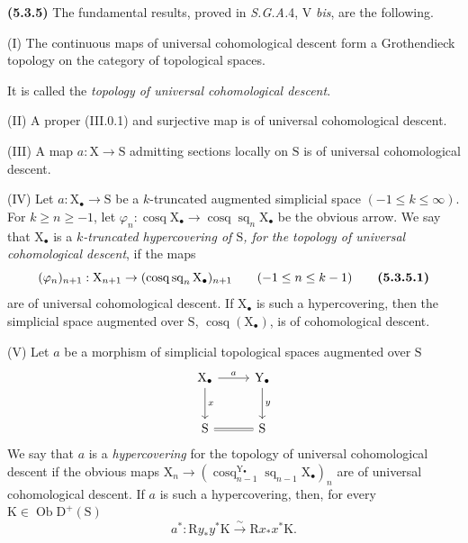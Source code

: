 \documentclass[11pt,leqno]{article}
\begin{document}
\textbf{(5.3.5)} The fundamental results, proved in \textit{S.G.A.}4, V \textit{bis}, are the following.

(I) The continuous maps of universal cohomological descent form a Grothendieck topology on the category of topological spaces.

It is called the \textit{topology of universal cohomological descent}.

(II) A proper (III.0.1) and surjective map is of universal cohomological descent.

(III) A map \(a:\mathrm{X}\to\mathrm{S}\) admitting sections locally on \(\mathrm{S}\) is of universal cohomological descent.

(IV) Let \(a:\mathrm{X}_{\bullet}\to\mathrm{S}\) be a \(k\)-truncated augmented simplicial space \((-1\leq k\leq\infty)\). For \(k\geq n\geq-1\), let \(\varphi_n:\operatorname{cosq}\mathrm{X}_{\bullet}\to\operatorname{cosq}\operatorname{sq}_n\mathrm{X}_{\bullet}\) be the obvious arrow. We say that \(\mathrm{X}_{\bullet}\) is a \textit{\(k\)-truncated hypercovering of \(\mathrm{S}\), for the topology of universal cohomological descent}, if the maps
\[
(\varphi_n)_{n+1}:\mathrm{X}_{n+1}
\to(\operatorname{cosq}\operatorname{sq}_n\mathrm{X}_{\bullet})_{n+1}
\qquad(-1\leq n\leq k-1)
\tag*{\textbf{(5.3.5.1)}}
\]
are of universal cohomological descent. If \(\mathrm{X}_{\bullet}\) is such a hypercovering, then the simplicial space augmented over \(\mathrm{S}\), \(\operatorname{cosq}(\mathrm{X}_{\bullet})\), is of cohomological descent.

(V) Let \(a\) be a morphism of simplicial topological spaces augmented over \(\mathrm{S}\)
\[
\begin{tikzcd}[column sep=2.5em,row sep=2.5em]
\mathrm{X}_{\bullet}\arrow[r,"a"]\arrow[d,"x"]
  & \mathrm{Y}_{\bullet}\arrow[d,"y"]\\
\mathrm{S}\arrow[r,equal] & \mathrm{S}
\end{tikzcd}
\]
We say that \(a\) is a \textit{hypercovering} for the topology of universal cohomological descent if the obvious maps \(\mathrm{X}_n\to(\operatorname{cosq}_{n-1}^{\mathrm{Y}_{\bullet}}\operatorname{sq}_{n-1}\mathrm{X}_{\bullet})_n\) are of universal cohomological descent. If \(a\) is such a hypercovering, then, for every \(\mathrm{K}\in\operatorname{Ob}\mathrm{D}^{+}(\mathrm{S})\)
\[
a^*:\mathrm{R}y_*y^*\mathrm{K}\xrightarrow{\sim}\mathrm{R}x_*x^*\mathrm{K}.
\]
\end{document}
